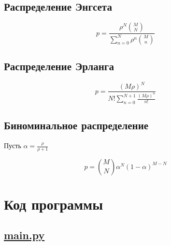 \documentclass[12pt]{article}
\newcommand\purl[1]{\protect\url{#1}} %
\begin{document}
\subsection{Распределение Энгсета}\label{subsec:engset}

 \[
     p = \frac{\rho ^ N \binom{M}{N}}
     {\sum_{n=0}^{N} \rho ^ n \binom{M}{n}}
 \]

\subsection{Распределение Эрланга}\label{subsec:erlang}

\[
     p = \frac{(M \rho) ^ N}
     {N!\sum_{n=0}^{N + 1} \frac{(M \rho) ^ n}{n!}}
\]

\subsection{Биноминальное распределение}\label{subsec:binom}
Пусть $\alpha = \frac{\rho}{\rho + 1}$

\[
     p = \binom{M}{N} \alpha ^ N (1 - \alpha) ^ {M - N}
\]

\section{Код программы}

\subsection{\purl{main.py}}
\end{document}
